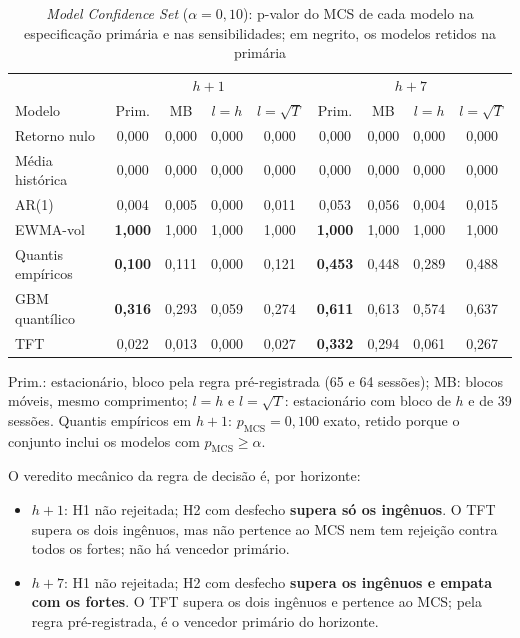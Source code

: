 \begin{table}[htb]
\centering
\caption[\textit{Model Confidence Set} (\(\alpha = 0{,}10\))]{\textit{Model Confidence Set} (\(\alpha = 0{,}10\)): p-valor do MCS de cada modelo na especificação primária e nas sensibilidades; em negrito, os modelos retidos na primária}
\label{tab:h2-mcs}
\small
\setlength{\tabcolsep}{3.5pt}
\begin{tabular}{l c c c c c c c c}
\toprule
 & \multicolumn{4}{c}{\(h+1\)} & \multicolumn{4}{c}{\(h+7\)} \\
Modelo & Prim. & MB & \(l{=}h\) & \(l{=}\sqrt{T}\) & Prim. & MB & \(l{=}h\) & \(l{=}\sqrt{T}\) \\
\midrule
Retorno nulo & 0,000 & 0,000 & 0,000 & 0,000 & 0,000 & 0,000 & 0,000 & 0,000 \\
Média histórica & 0,000 & 0,000 & 0,000 & 0,000 & 0,000 & 0,000 & 0,000 & 0,000 \\
AR(1) & 0,004 & 0,005 & 0,000 & 0,011 & 0,053 & 0,056 & 0,004 & 0,015 \\
EWMA-vol & \textbf{1,000} & 1,000 & 1,000 & 1,000 & \textbf{1,000} & 1,000 & 1,000 & 1,000 \\
Quantis empíricos & \textbf{0,100} & 0,111 & 0,000 & 0,121 & \textbf{0,453} & 0,448 & 0,289 & 0,488 \\
GBM quantílico & \textbf{0,316} & 0,293 & 0,059 & 0,274 & \textbf{0,611} & 0,613 & 0,574 & 0,637 \\
TFT & 0,022 & 0,013 & 0,000 & 0,027 & \textbf{0,332} & 0,294 & 0,061 & 0,267 \\
\bottomrule
\end{tabular}

\smallskip
{\footnotesize Prim.: estacionário, bloco pela regra pré-registrada (65 e 64 sessões); MB: blocos móveis, mesmo comprimento; \(l{=}h\) e \(l{=}\sqrt{T}\): estacionário com bloco de \(h\) e de 39 sessões. Quantis empíricos em \(h+1\): \(p_{\text{MCS}} = 0{,}100\) exato, retido porque o conjunto inclui os modelos com \(p_{\text{MCS}} \geq \alpha\).\par}
\end{table}

O veredito mecânico da regra de decisão é, por horizonte:
\begin{itemize}
    \item \textbf{\(h+1\)}: H1 não rejeitada; H2 com desfecho \textbf{supera só os ingênuos}. O TFT supera os dois ingênuos, mas não pertence ao MCS nem tem rejeição contra todos os fortes; não há vencedor primário.
    \item \textbf{\(h+7\)}: H1 não rejeitada; H2 com desfecho \textbf{supera os ingênuos e empata com os fortes}. O TFT supera os dois ingênuos e pertence ao MCS; pela regra pré-registrada, é o vencedor primário do horizonte.
\end{itemize}

